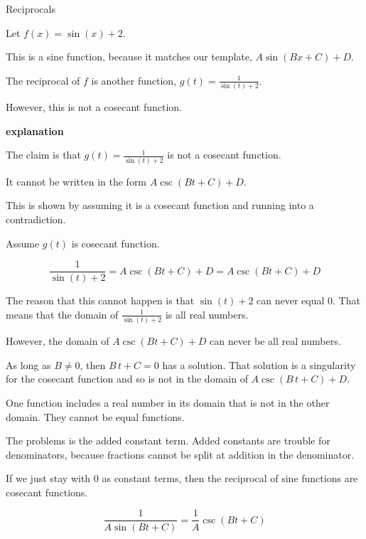 \documentclass{ximera}
\begin{document}
\begin{example} Reciprocals


Let $f(x) = \sin(x) + 2$.

This is a sine function, because it matches our template, $A \sin(B x + C) + D$.

The reciprocal of $f$ is another function, $g(t) = \frac{1}{\sin(t) + 2}$.

However, this is not a cosecant function.

\textbf{\textcolor{red!75!green}{explanation}} 


The claim is that $g(t) = \frac{1}{\sin(t) + 2}$ is not a cosecant function.

It cannot be written in the form $A \csc(B t + C) + D$.


This is shown by assuming it is a cosecant function and running into a contradiction.


Assume $g(t)$ is cosecant function.


\[
\frac{1}{\sin(t) + 2} = A \csc(B t + C) + D = A \csc(B t + C) + D
\]


The reason that this cannot happen is that $\sin(t) + 2$ can never equal $0$. That means that the domain of $\frac{1}{\sin(t) + 2}$ is all real numbers.

However, the domain of $A \csc(B t + C) + D$ can never be all real numbers.


As long as $B \ne 0$, then $B \, t + C = 0$ has a solution.  That solution is a singularity for the cosecant function and so is not in the domain of $A \csc(B \, t + C) + D$.

One function includes a real number in its domain that is not in the other domain.  They cannot be equal functions.




\end{example}

The problems is the added constant term.  Added constants are trouble for denominators, because fractions cannot be split at addition in the denominator.




If we just stay with $0$ as constant terms, then the reciprocal of sine functions are cosecant functions.



\[
\frac{1}{A \sin(B t + C)} = \frac{1}{A} \csc(B t + C) 
\]
\end{document}
